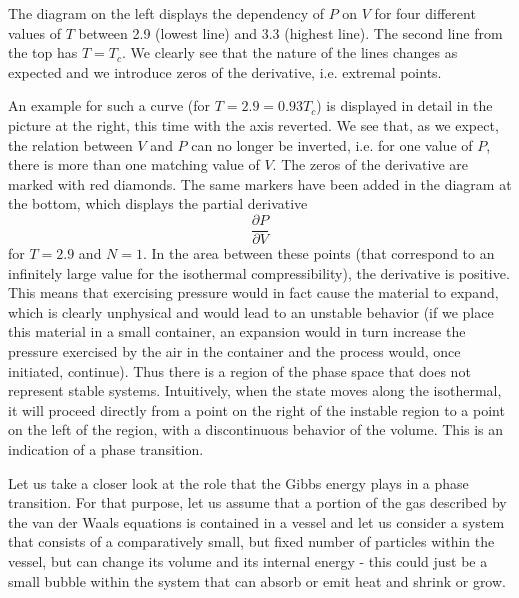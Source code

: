 \documentclass[a4paper, draft]{report}
\numberwithin{section}{chapter}
\numberwithin{equation}{chapter}
\theoremstyle{own}
\theoremstyle{remark}
\begin{document}
The diagram on the left displays the dependency of $P$ on $V$ for four different values of $T$ between 2.9 (lowest line) and 3.3 (highest line). The second line from the top has $T = T_c$. We clearly see that the nature of the lines changes as expected and we introduce zeros of the derivative, i.e. extremal points. 

An example for such a curve (for $T=2.9 = 0.93 T_c$) is displayed in detail in the picture at the right, this time with the axis reverted. We see that, as we expect, the relation between $V$ and $P$ can no longer be inverted, i.e. for one value of $P$, there is more than one matching value of $V$. The zeros of the derivative are marked with red diamonds. The same markers have been added in the diagram at the bottom, which displays the partial derivative
$$
\frac{\partial{P}}{\partial V}
$$
for $T=2.9$ and $N=1$. In the area between these points (that correspond to an infinitely large value for the isothermal compressibility), the derivative is positive. This means that exercising pressure would in fact cause the material to expand, which is clearly unphysical and would lead to an unstable behavior  (if we place this material in a small container, an expansion would in turn increase the pressure exercised by the air in the container and the process would, once initiated, continue). Thus there is a region of the phase space that does not represent stable systems. Intuitively, when the state moves along the isothermal, it will proceed directly from a point on the right of the instable region to a point on the left of the region, with a discontinuous behavior of the volume. This is an indication of a phase transition.

Let us take a closer look at the role that the Gibbs energy plays in a phase transition. For that purpose, let us assume that a portion of the gas described by the van der Waals equations is contained in a vessel and let us consider a system that consists of a comparatively small, but fixed number of particles within the vessel, but can change its volume and its internal energy - this could just be a small bubble within the system that can absorb or emit heat and shrink or grow. 
\end{document}
